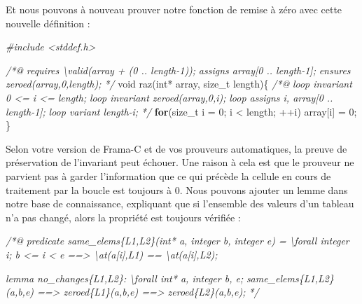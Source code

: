\documentclass[12pt,francais,]{scrbook}
\newenvironment{Shaded}{}{}
\newcommand{\KeywordTok}[1]{\textcolor[rgb]{0.00,0.44,0.13}{\textbf{{#1}}}}
\newcommand{\DataTypeTok}[1]{\textcolor[rgb]{0.56,0.13,0.00}{{#1}}}
\newcommand{\DecValTok}[1]{\textcolor[rgb]{0.25,0.63,0.44}{{#1}}}
\newcommand{\CommentTok}[1]{\textcolor[rgb]{0.38,0.63,0.69}{\textit{{#1}}}}
\newcommand{\NormalTok}[1]{{#1}}
\begin{document}
Et nous pouvons à nouveau prouver notre fonction de remise à zéro avec
cette nouvelle définition :

\begin{footnotesize}\begin{Shaded}
\begin{Highlighting}[]
\CommentTok{#include <stddef.h>}

\CommentTok{/*@}
\CommentTok{  requires \textbackslash{}valid(array + (0 .. length-1));}
\CommentTok{  assigns  array[0 .. length-1];}
\CommentTok{  ensures  zeroed(array,0,length);}
\CommentTok{*/}
\DataTypeTok{void} \NormalTok{raz(}\DataTypeTok{int}\NormalTok{* array, size_t length)\{}
  \CommentTok{/*@}
\CommentTok{    loop invariant 0 <= i <= length;}
\CommentTok{    loop invariant zeroed(array,0,i);}
\CommentTok{    loop assigns i, array[0 .. length-1];}
\CommentTok{    loop variant length-i;}
\CommentTok{  */}
  \KeywordTok{for}\NormalTok{(size_t i = }\DecValTok{0}\NormalTok{; i < length; ++i)}
    \NormalTok{array[i] = }\DecValTok{0}\NormalTok{;}
\NormalTok{\}}
\end{Highlighting}
\end{Shaded}\end{footnotesize}

Selon votre version de Frama-C et de vos prouveurs automatiques, la
preuve de préservation de l'invariant peut échouer. Une raison à cela
est que le prouveur ne parvient pas à garder l'information que ce qui
précède la cellule en cours de traitement par la boucle est toujours à
0. Nous pouvons ajouter un lemme dans notre base de connaissance,
expliquant que si l'ensemble des valeurs d'un tableau n'a pas changé,
alors la propriété est toujours vérifiée :

\begin{footnotesize}\begin{Shaded}
\begin{Highlighting}[]
\CommentTok{/*@}
\CommentTok{  predicate same_elems\{L1,L2\}(int* a, integer b, integer e) =}
\CommentTok{    \textbackslash{}forall integer i; b <= i < e ==> \textbackslash{}at(a[i],L1) == \textbackslash{}at(a[i],L2);}

\CommentTok{  lemma no_changes\{L1,L2\}:}
\CommentTok{  \textbackslash{}forall int* a, integer b, e;}
\CommentTok{  same_elems\{L1,L2\}(a,b,e) ==> zeroed\{L1\}(a,b,e) ==> zeroed\{L2\}(a,b,e);}
\CommentTok{*/}
\end{Highlighting}
\end{Shaded}\end{footnotesize}
\end{document}
